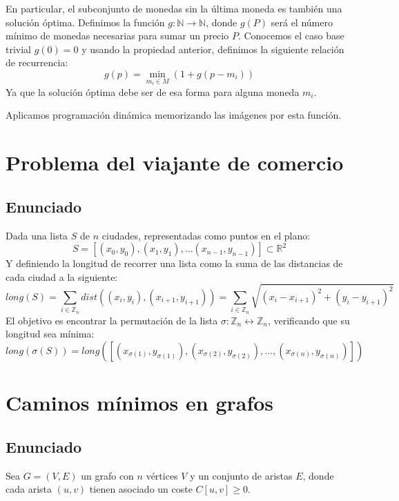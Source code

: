 \documentclass[a4paper, 11pt]{article} %
\begin{document}
    En particular, el subconjunto de monedas sin la última moneda es también una solución óptima.
    Definimos la función $g: \mathbb{N} \to \mathbb{N}$, donde $g(P)$ será el número
    mínimo de monedas necesarias para sumar un precio $P$. Conocemos el caso base trivial $g(0) = 0$ y
    usando la propiedad anterior, definimos la siguiente relación de recurrencia:
    \begin{equation}
      g(p) = \min_{m_i \in M} (1 + g(p - m_i))
    \end{equation}
    Ya que la solución óptima debe ser de esa forma para alguna moneda $m_i$.
  
    Aplicamos programación dinámica memorizando las imágenes por esta función.
  
\section{Problema del viajante de comercio}
  \subsection{Enunciado}
  	Dada una lista $S$ de $n$ ciudades, representadas como puntos en el plano:
  	\begin{equation}
  	    S = [(x_0,y_0), (x_1,y_1), \dots (x_{n-1},y_{n-1})] \subset \mathbb{R}^2
  	\end{equation}
  	Y definiendo la longitud de recorrer una lista como la suma de las distancias de cada ciudad a la siguiente:
  	\begin{equation}
  	    long(S) = \sum_{i \in \mathbb{Z}_n} dist((x_i,y_i), (x_{i+1}, y_{i+1})) = \sum_{i \in \mathbb{Z}_n} \sqrt{(x_i-x_{i+1})^2 + (y_i-y_{i+1})^2}
  	\end{equation}
  	El objetivo es encontrar la permutación de la lista $\sigma : \mathbb{Z}_n \leftrightarrow \mathbb{Z}_n$, verificando que su longitud sea mínima:
  	\begin{equation}
  	    long(\sigma(S)) = long([(x_{\sigma(1)},y_{\sigma(1)}), (x_{\sigma(2)},y_{\sigma(2)}), \dots, (x_{\sigma(n)},y_{\sigma(n)})])
      \end{equation}
      

\section{Caminos mínimos en grafos}
  \subsection{Enunciado}
    Sea $G=(V,E)$ un grafo con $n$ vértices $V$ y un conjunto de aristas $E$,
    donde cada arista $(u,v)$ tienen asociado un coste $C[u,v] \geq 0$.
    
\end{document}
